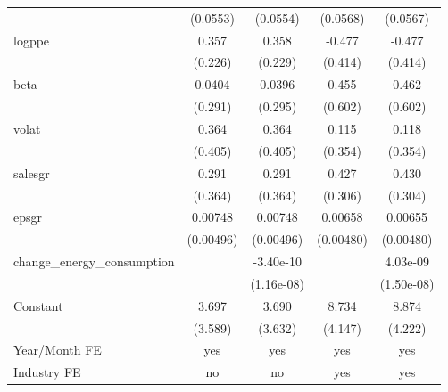 \begin{table}[htbp]
\begin{tabular}{l*{4}{c}}
                    &    (0.0553)         &    (0.0554)         &    (0.0568)         &    (0.0567)         \\
[1em]
logppe              &       0.357         &       0.358         &      -0.477         &      -0.477         \\
                    &     (0.226)         &     (0.229)         &     (0.414)         &     (0.414)         \\
[1em]
beta                &      0.0404         &      0.0396         &       0.455         &       0.462         \\
                    &     (0.291)         &     (0.295)         &     (0.602)         &     (0.602)         \\
[1em]
volat               &       0.364         &       0.364         &       0.115         &       0.118         \\
                    &     (0.405)         &     (0.405)         &     (0.354)         &     (0.354)         \\
[1em]
salesgr             &       0.291         &       0.291         &       0.427         &       0.430         \\
                    &     (0.364)         &     (0.364)         &     (0.306)         &     (0.304)         \\
[1em]
epsgr               &     0.00748         &     0.00748         &     0.00658         &     0.00655         \\
                    &   (0.00496)         &   (0.00496)         &   (0.00480)         &   (0.00480)         \\
[1em]
change\_energy\_consumption&                     &   -3.40e-10         &                     &    4.03e-09         \\
                    &                     &  (1.16e-08)         &                     &  (1.50e-08)         \\
[1em]
Constant            &       3.697         &       3.690         &       8.734\sym{**} &       8.874\sym{**} \\
                    &     (3.589)         &     (3.632)         &     (4.147)         &     (4.222)         \\
\hline
Year/Month FE       &         yes         &         yes         &         yes         &         yes         \\
Industry FE         &          no         &          no         &         yes         &         yes         \\

\end{tabular}
\end{table}
